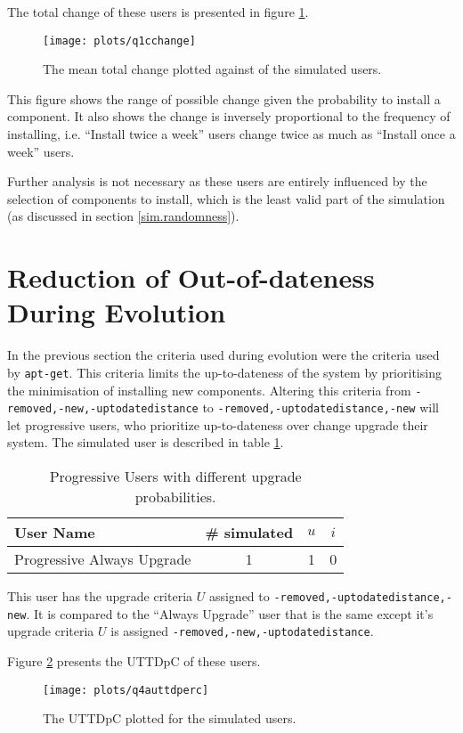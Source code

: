 The total change of these users is presented in figure \ref{exp.q1cchange}.
\begin{figure}[htp]
\begin{center}
  \texttt{[image: plots/q1cchange]}
  \caption{The mean total change plotted against of the simulated users.}
  \label{exp.q1cchange}
\end{center}
\end{figure}
This figure shows the range of possible change given the probability to install a component.
It also shows the change is inversely proportional to the frequency of installing, 
i.e. ``Install twice a week'' users change twice as much as ``Install once a week'' users.

Further analysis is not necessary as these users are entirely influenced by the selection of components to install, which is the least valid part of the simulation (as discussed in section \ref{sim.randomness}).

\section{Reduction of Out-of-dateness During Evolution}
\label{exp.q2}
\label{exp.prouttdsection}
In the previous section the criteria used during evolution were the criteria used by \texttt{apt-get}.
This criteria limits the up-to-dateness of the system by prioritising the minimisation of installing new components.
Altering this criteria from \texttt{-removed,-new,-uptodatedistance} to \texttt{-removed,-uptodatedistance,-new} 
will let progressive users, who prioritize up-to-dateness over change upgrade their system.
The simulated user is described in table \ref{exp.tblq4ausers}.
\begin{table}[h!]
\centering
\begin{tabular}{|l | c | c | c |}
\hline
User Name 								& \# simulated 			& $u$ 		& $i$ 			\\ \hline
Progressive Always Upgrade				& 1 			 	& 1				& 0\\ \hline
\end{tabular}
\caption{Progressive Users with different upgrade probabilities.}
\label{exp.tblq4ausers}
\end{table}
This user has the upgrade criteria $U$ assigned to \texttt{-removed,-uptodatedistance,-new}.
It is compared to the ``Always Upgrade'' user that is the same except it's upgrade criteria $U$ is assigned \texttt{-removed,-new,-uptodatedistance}.

Figure \ref{exp.q4auttdperc} presents the UTTDpC of these users.
\begin{figure}[htp]
\begin{center}
  \texttt{[image: plots/q4auttdperc]}
  \caption{The UTTDpC plotted for the simulated users.}
  \label{exp.q4auttdperc}
\end{center}
\end{figure}

